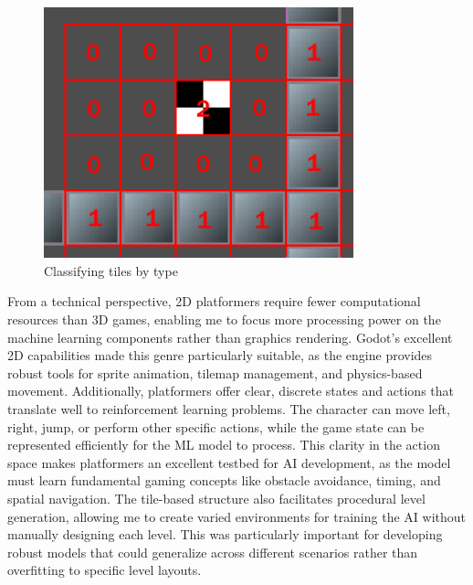 \begin{figure}[H]
    \centering
    \includegraphics[width=0.8\textwidth]{figures/tilemap.png}
    \caption{Classifying tiles by type}
    \label{fig:tilemap}
\end{figure}

From a technical perspective, 2D platformers require fewer computational resources than 3D games, enabling me to focus more processing power on the machine learning components rather than graphics rendering. 
Godot's excellent 2D capabilities made this genre particularly suitable, as the engine provides robust tools for sprite animation, tilemap management, and physics-based movement.
Additionally, platformers offer clear, discrete states and actions that translate well to reinforcement learning problems. 
The character can move left, right, jump, or perform other specific actions, while the game state can be represented efficiently for the ML model to process.
This clarity in the action space makes platformers an excellent testbed for AI development, as the model must learn fundamental gaming concepts like obstacle avoidance, timing, and spatial navigation.
The tile-based structure also facilitates procedural level generation, allowing me to create varied environments for training the AI without manually designing each level. 
This was particularly important for developing robust models that could generalize across different scenarios rather than overfitting to specific level layouts.

